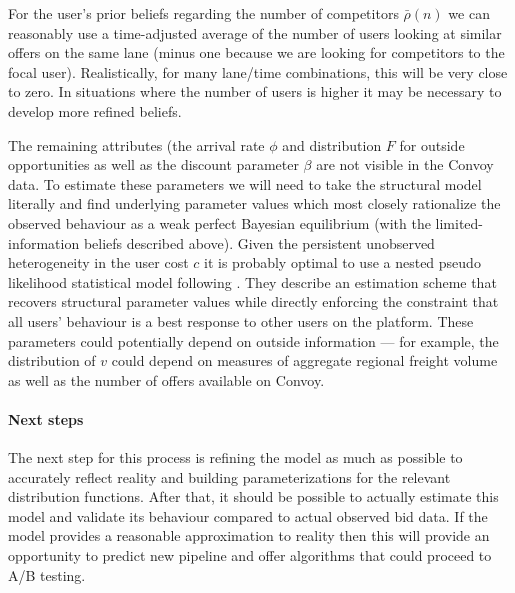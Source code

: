 \documentclass[12pt]{article}
\begin{document}
For the user's prior beliefs regarding the number of competitors $\bar{\rho}\left(n\right)$ we can reasonably use a time-adjusted average of the number of users looking at similar offers on the same lane (minus one because we are looking for competitors to the focal user). Realistically, for many lane/time combinations, this will be very close to zero. In situations where the number of users is higher it may be necessary to develop more refined beliefs. 

The remaining attributes (the arrival rate $\phi$ and distribution $F$ for outside opportunities as well as the discount parameter $\beta$ are not visible in the Convoy data.  To estimate these parameters we will need to take the structural model literally and find underlying parameter values which most closely rationalize the observed behaviour as a weak perfect Bayesian equilibrium (with the limited-information beliefs described above). Given the persistent unobserved heterogeneity in the user cost $c$ it is probably optimal to use a nested pseudo likelihood statistical model following \cite{Aguirregabiria2007}. They describe an estimation scheme that recovers structural parameter values while directly enforcing the constraint that all users' behaviour is a best response to other users on the platform. These parameters could potentially depend on outside information --- for example, the distribution of $v$ could depend on measures of aggregate regional freight volume as well as the number of offers available on Convoy.

\paragraph{Next steps}
The next step for this process is refining the model as much as possible to accurately reflect reality and building parameterizations for the relevant distribution functions. After that, it should be possible to actually estimate this model and validate its behaviour compared to actual observed bid data. If the model provides a reasonable approximation to reality then this will provide an opportunity to predict new pipeline and offer algorithms that could proceed to A/B testing.


\end{document}
